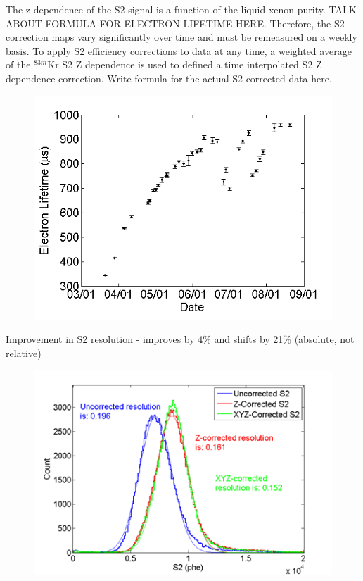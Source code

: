\documentclass[a4paper,12pt]{article}
\begin{document}
{The z-dependence of the S2 signal is a function of the liquid xenon purity.  TALK ABOUT FORMULA FOR ELECTRON LIFETIME HERE. Therefore, the S2 correction maps vary significantly over time and must be remeasured on a weekly basis.  To apply S2 efficiency corrections to data at any time, a weighted average of the $^{83m}$Kr S2 Z dependence is used to defined a time interpolated S2 Z dependence correction.  
Write formula for the actual S2 corrected data here.

\begin{figure} [!h]
\includegraphics[scale=.75]{LUX_eLifetime_Run03.png} 
\label{KrS2Improvement}
\end{figure}

Improvement in S2 resolution - improves by 4\% and shifts by 21\% (absolute, not relative)

\begin{figure} [!h]
\includegraphics[scale=.75]{KRS2_ResolutionImprovement.png} 
\label{KrS2Improvement}
\end{figure}

}
\end{document}
